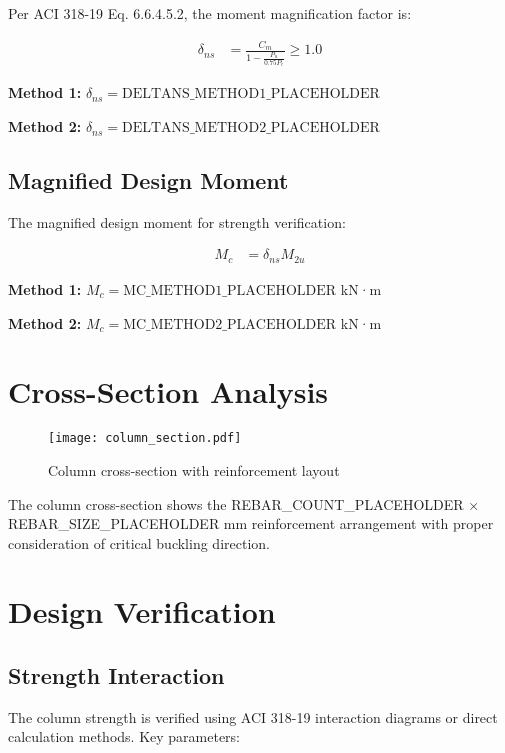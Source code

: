 \documentclass[
  10pt,
  letterpaper,
  twocolumn
]{article}
\begin{document}
Per ACI 318-19 Eq. 6.6.4.5.2, the moment magnification factor is:

\begin{align}
\delta_{ns} &= \frac{C_m}{1 - \frac{P_u}{0.75P_c}} \geq 1.0 \label{eq:delta_ns}
\end{align}

\textbf{Method 1:} $\delta_{ns} = \text{DELTANS_METHOD1_PLACEHOLDER}$

\textbf{Method 2:} $\delta_{ns} = \text{DELTANS_METHOD2_PLACEHOLDER}$

\subsection{Magnified Design Moment}

The magnified design moment for strength verification:

\begin{align}
M_c &= \delta_{ns} M_{2u} \label{eq:mc}
\end{align}

\textbf{Method 1:} $M_c = \text{MC_METHOD1_PLACEHOLDER}$ kN·m

\textbf{Method 2:} $M_c = \text{MC_METHOD2_PLACEHOLDER}$ kN·m

\section{Cross-Section Analysis}

\begin{figure}[h]
\centering
\texttt{[image: column\_section.pdf]}
\caption{Column cross-section with reinforcement layout}
\label{fig:column_section}
\end{figure}

The column cross-section shows the REBAR_COUNT_PLACEHOLDER × REBAR_SIZE_PLACEHOLDER mm reinforcement arrangement with proper consideration of critical buckling direction.

\section{Design Verification}

\subsection{Strength Interaction}

The column strength is verified using ACI 318-19 interaction diagrams or direct calculation methods. Key parameters:
\end{document}
